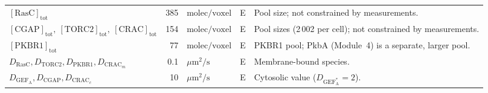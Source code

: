 \begin{table}[!t]
\begin{tabularx}{\textwidth}{@{}l r l c >{\raggedright\arraybackslash}X@{}}
$[\mathrm{RasC}]_\mathrm{tot}$ & \num{385} & $\mathrm{molec/voxel}$ & E & Pool size; not constrained by measurements. \\
$[\mathrm{CGAP}]_\mathrm{tot},\ [\mathrm{TORC2}]_\mathrm{tot},\ [\mathrm{CRAC}]_\mathrm{tot}$ & \num{154} & $\mathrm{molec/voxel}$ & E & Pool sizes (2\,002 per cell); not constrained by measurements. \\
$[\mathrm{PKBR1}]_\mathrm{tot}$ & \num{77} & $\mathrm{molec/voxel}$ & E & PKBR1 pool; PkbA (Module~4) is a separate, larger pool. \\
$D_{\mathrm{RasC}},D_{\mathrm{TORC2}},D_{\mathrm{PKBR1}},D_{\mathrm{CRAC}_m}$ & \num{0.1} & $\mu\mathrm{m^2/s}$ & E & Membrane-bound species. \\
$D_{\mathrm{GEF_A}},D_{\mathrm{CGAP}},D_{\mathrm{CRAC}_c}$ & \num{10} & $\mu\mathrm{m^2/s}$ & E & Cytosolic value ($D_{\mathrm{GEF_A^*}}=2$). \\
\bottomrule
\end{tabularx}
\end{table}

